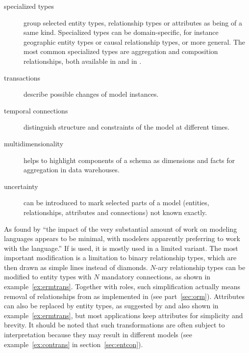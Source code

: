 \begin{description}
\item[specialized types] group selected entity types, relationship
  types or attributes as being of a same kind. Specialized types can be
  domain-specific, for instance geographic entity types or causal relationship
  types, or more general. The most common specialized types are aggregation and
  composition relationships, both available in  and in .

\item[transactions] describe possible changes of model instances.

\item[temporal connections] distinguish structure and constraints of 
 the model at different times.

\item[multidimensionality] helps to highlight components of a schema
 as dimensions and facts for aggregation in data warehouses.

\item[uncertainty] can be introduced to mark selected parts of a model 
  (entities, relationships, attributes and connections) not known exactly.
\end{description}

As found by \textcite[345]{Simsion2007} ``the impact of the very substantial
amount of work on modeling languages appears to be minimal, with modelers
apparently preferring to work with the  language.'' If  is
used, it is mostly used in a limited variant. The most important modification
is a limitation to binary relationship types, which are then drawn as simple
lines instead of diamonds. $N$-ary relationship types can be modified to entity
types with $N$ mandatory connections, as shown in example~\ref{ex:ermtrans}.
Together with roles, such simplification actually means removal of
relationships from  as implemented in 
(see part~\ref{sec:orm}). Attributes can also be replaced by entity types, as
suggested by \textcite{Kent1983b,Kent1984} and also shown in 
example~\ref{ex:ermtrans}, but most applications keep attributes for simplicity
and brevity. It should be noted that such transformations are often subject to
interpretation because they may result in different models (see 
example~\ref{ex:contrans} in section~\ref{sec:entcon}).

